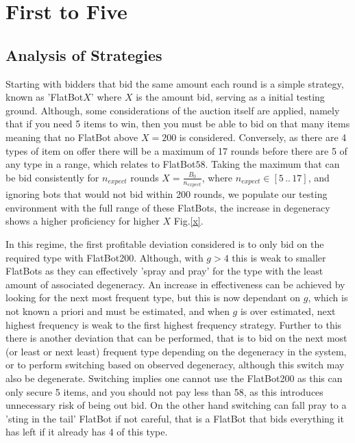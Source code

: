 \documentclass[10pt,conference,twocolumn]{IEEEtran}
\begin{document}
    
\section{First to Five}

\subsection{Analysis of Strategies}

Starting with bidders that bid the same amount each round is a simple strategy, known as 'FlatBot$X$' where $X$ is the amount bid, serving as a initial testing ground. Although, some considerations of the auction itself are applied, namely that if you need 5 items to win, then you must be able to bid on that many items meaning that no FlatBot above $X=200$ is considered. Conversely, as there are 4 types of item on offer there will be a maximum of 17 rounds before there are 5 of any type in a range, which relates to FlatBot$58$. Taking the maximum that can be bid consistently for $n_{expect}$ rounds $X = \frac{B_0}{n_{expect}}$, where $n_{expect}\in [5 \, .. \, 17]$, and ignoring bots that would not bid within 200 rounds, we populate our testing environment with the full range of these FlatBots, the increase in degeneracy shows a higher proficiency for higher $X$ Fig.\ref{x}.

 In this regime, the first profitable deviation considered is to only bid on the required type with FlatBot200. Although, with $g>4$  this is weak to smaller FlatBots as they can effectively 'spray and pray' for the type with the least amount of associated degeneracy. An increase in effectiveness can be achieved by looking for the next most frequent type, but this is now dependant on $g$, which is not known a priori and must be estimated, and when $g$ is over estimated, next highest frequency is weak to the first highest frequency strategy. Further to this there is another deviation that can be performed, that is to bid on the next most (or least or next least) frequent type depending on the degeneracy in the system, or to perform switching based on observed degeneracy, although this switch may also be degenerate. Switching implies one cannot use the FlatBot200 as this can only secure 5 items, and you should not pay less than 58, as this introduces unnecessary risk of being out bid. On the other hand switching can fall pray to a 'sting in the tail' FlatBot if not careful, that is a FlatBot that bids everything it has left if it already has 4 of this type.
\end{document}
